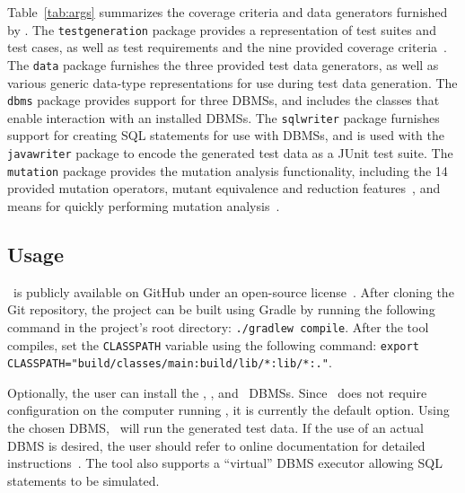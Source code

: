 Table~\ref{tab:args} summarizes the coverage criteria and data generators furnished by \sa. The \texttt{testgeneration}
package provides a representation of test suites and test cases, as well as test requirements and the nine provided
coverage criteria~\cite{mcminn2015effectiveness}.  The \texttt{data} package furnishes the three provided test data
generators, as well as various generic data-type representations for use during test data generation. The \texttt{dbms}
package provides support for three DBMSs, and includes the classes that enable interaction with an installed DBMSs. The
\texttt{sqlwriter} package furnishes support for creating SQL statements for use with DBMSs, and is used with the
\texttt{javawriter} package to encode the generated test data as a JUnit test suite.  The \texttt{mutation} package
provides the mutation analysis functionality, including the 14 provided mutation operators, mutant equivalence and
reduction features~\cite{wright2014impact}, and means for quickly performing mutation analysis~\cite{mcminn2016virtual}.

\subsection{Usage}



\sa~is publicly available on GitHub under an open-source license~\cite{tool}. After cloning the Git
repository, the project can be built using Gradle by running the following command in the project's root directory:
\lstinline{./gradlew compile}. After the tool compiles, set the \lstinline{CLASSPATH} variable using the following
command: \lstinline{export CLASSPATH="build/classes/main:build/lib/*:lib/*:."}.


Optionally, the user can install the \postgres, \sqlite, and \hypersql~DBMSs. Since \sqlite~does not require
configuration on the computer running \sa, it is currently the default option. Using the chosen DBMS, \sa~will run the
generated test data. If the use of an actual DBMS is desired, the user should refer to online documentation for detailed
instructions~\cite{tool}. The tool also supports a ``virtual'' DBMS executor allowing SQL statements to be simulated.

